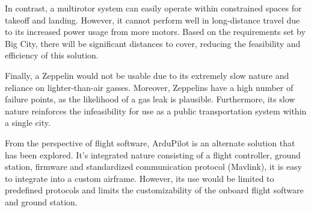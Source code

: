 In contrast, a multirotor system can easily operate within constrained spaces for
takeoff and landing. However, it cannot perform well in long-distance travel due to
its increased power usage from more motors. Based on the requirements set by Big City,
there will be significant distances to cover, reducing the feasibility and efficiency
of this solution.

Finally, a Zeppelin would not be usable due to its extremely slow nature and reliance
on lighter-than-air gasses. Moreover, Zeppelins have a high number of failure points,
as the likelihood of a gas leak is plausible. Furthermore, its slow nature reinforces
the infeasibility for use as a public transportation system within a single city.

From the perspective of flight software, ArduPilot is an alternate solution that has 
been explored. It's integrated nature consisting of a flight controller, ground 
station, firmware and standardized communication protocol (Mavlink), it is easy to
integrate into a custom airframe. However, its use would be limited to predefined 
protocols and limits the customizability of the onboard flight software and ground
station.